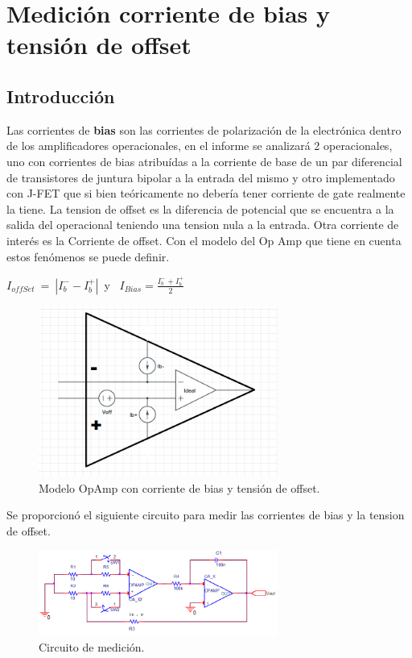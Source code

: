 
\section{Medici\'on corriente de bias y tensi\'on de offset}

\subsection{Introducción}
Las corrientes de \textbf{bias} son las corrientes de polarización de la electrónica dentro de los amplificadores operacionales, en el informe se analizará 2 operacionales, uno con corrientes de bias atribuídas a la corriente de base de un par diferencial de transistores de juntura bipolar a la entrada del mismo y otro implementado con J-FET que si bien teóricamente no debería tener corriente de gate realmente la tiene.
La tension de offset es la diferencia de potencial que se encuentra a la salida del operacional teniendo una tension nula a la entrada.
Otra corriente de interés es la Corriente de offset.
Con el modelo del Op Amp que tiene en cuenta estos fenómenos se puede definir.\newline
 	
 $I_{offSet} \ = \ |I_b^{-}-I_b^{+}|$\ y \ $I_{Bias}= \frac{I_b^-+I_b^{+}}{2}$
\begin{figure}[htb]	
	\centering
	\includegraphics[width=0.7\textwidth]{Ej3/imagenes/opampReal.PNG}
	\caption{Modelo OpAmp con corriente de bias y tensión de offset.}
	\label{fig:OpampBias}
\end{figure}



Se proporcionó el siguiente circuito para medir las corrientes de bias y la tension de offset.

\begin{figure}[htb]	
	\centering
	\includegraphics[width=0.7\textwidth]{Ej3/imagenes/CircMedicion.PNG}
	\caption{Circuito de medición.}
	\label{fig:CircMedicion}
\end{figure}

